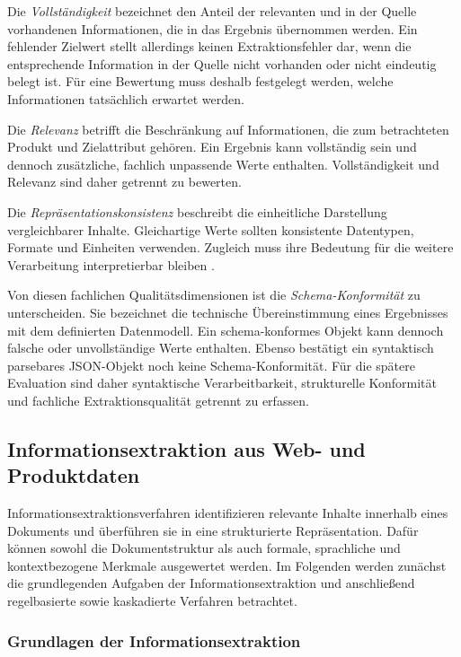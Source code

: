 Die \emph{Vollständigkeit} bezeichnet den Anteil der relevanten und in der Quelle vorhandenen Informationen, die in das Ergebnis übernommen werden. Ein fehlender 
Zielwert stellt allerdings keinen Extraktionsfehler dar, wenn die entsprechende Information in der Quelle nicht vorhanden oder nicht eindeutig belegt ist. Für 
eine Bewertung muss deshalb festgelegt werden, welche Informationen tatsächlich erwartet werden.

Die \emph{Relevanz} betrifft die Beschränkung auf Informationen, die zum betrachteten Produkt und Zielattribut gehören. Ein Ergebnis kann vollständig sein und 
dennoch zusätzliche, fachlich unpassende Werte enthalten. Vollständigkeit und Relevanz sind daher getrennt zu bewerten.

Die \emph{Repräsentationskonsistenz} beschreibt die einheitliche Darstellung vergleichbarer Inhalte. Gleichartige Werte sollten konsistente Datentypen, Formate 
und Einheiten verwenden. Zugleich muss ihre Bedeutung für die weitere Verarbeitung interpretierbar bleiben \cite{wang1996beyond,batini2016data}.

Von diesen fachlichen Qualitätsdimensionen ist die \emph{Schema-Konformität} zu unterscheiden. Sie bezeichnet die technische Übereinstimmung eines Ergebnisses mit 
dem definierten Datenmodell. Ein schema-konformes Objekt kann dennoch falsche oder unvollständige Werte enthalten. Ebenso bestätigt ein syntaktisch parsebares 
JSON-Objekt noch keine Schema-Konformität. Für die spätere Evaluation sind daher syntaktische Verarbeitbarkeit, strukturelle Konformität und fachliche Extraktionsqualität 
getrennt zu erfassen.

\subsection{Informationsextraktion aus Web- und Produktdaten}

Informationsextraktionsverfahren identifizieren relevante Inhalte innerhalb eines Dokuments und überführen sie in eine strukturierte Repräsentation. Dafür können 
sowohl die Dokumentstruktur als auch formale, sprachliche und kontextbezogene Merkmale ausgewertet werden. Im Folgenden werden zunächst die grundlegenden Aufgaben 
der Informationsextraktion und anschließend regelbasierte sowie kaskadierte Verfahren betrachtet.

\subsubsection{Grundlagen der Informationsextraktion}

